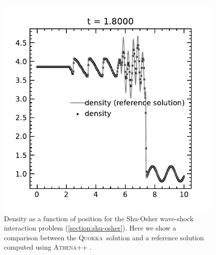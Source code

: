\documentclass[fleqn,usenatbib]{mnras}
\newcommand{\quokka}{\textsc{Quokka}}
\begin{document}
\begin{figure}
    \includegraphics[width=\columnwidth]{hydro_shuosher.pdf}
    \caption{Density as a function of position for the Shu-Osher wave-shock interaction problem (\autoref{section:shu-osher}). Here we show a comparison between the \quokka~solution and a reference solution computed using \textsc{Athena++} \citep{Stone_2020}.}
    \label{fig:shu_osher}
\end{figure}
\end{document}
